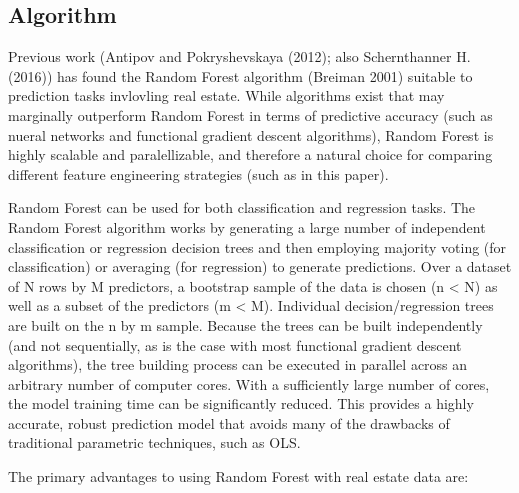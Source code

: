 \documentclass[]{article}
\begin{document}
\subsection{Algorithm}\label{algorithm}

Previous work (Antipov and Pokryshevskaya (2012); also Schernthanner H.
(2016)) has found the Random Forest algorithm (Breiman 2001) suitable to
prediction tasks invlovling real estate. While algorithms exist that may
marginally outperform Random Forest in terms of predictive accuracy
(such as nueral networks and functional gradient descent algorithms),
Random Forest is highly scalable and paralellizable, and therefore a
natural choice for comparing different feature engineering strategies
(such as in this paper).

Random Forest can be used for both classification and regression tasks.
The Random Forest algorithm works by generating a large number of
independent classification or regression decision trees and then
employing majority voting (for classification) or averaging (for
regression) to generate predictions. Over a dataset of N rows by M
predictors, a bootstrap sample of the data is chosen (n \textless{} N)
as well as a subset of the predictors (m \textless{} M). Individual
decision/regression trees are built on the n by m sample. Because the
trees can be built independently (and not sequentially, as is the case
with most functional gradient descent algorithms), the tree building
process can be executed in parallel across an arbitrary number of
computer cores. With a sufficiently large number of cores, the model
training time can be significantly reduced. This provides a highly
accurate, robust prediction model that avoids many of the drawbacks of
traditional parametric techniques, such as OLS.

The primary advantages to using Random Forest with real estate data are:
\end{document}
